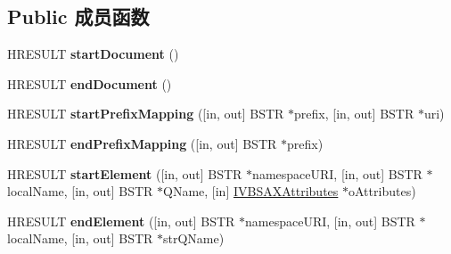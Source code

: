 \subsection*{Public 成员函数}
\begin{DoxyCompactItemize}
\item 
\mbox{\label{interface_m_s_x_m_l2_1_1_i_v_b_s_a_x_content_handler_a67db42d558655301b6a03a09e46c5174}} 
H\+R\+E\+S\+U\+LT {\bfseries start\+Document} ()
\item 
\mbox{\label{interface_m_s_x_m_l2_1_1_i_v_b_s_a_x_content_handler_a6842da9db003a4dc4baf76ac9760e700}} 
H\+R\+E\+S\+U\+LT {\bfseries end\+Document} ()
\item 
\mbox{\label{interface_m_s_x_m_l2_1_1_i_v_b_s_a_x_content_handler_affe4ce1e3b99e524f610cae1aa302a47}} 
H\+R\+E\+S\+U\+LT {\bfseries start\+Prefix\+Mapping} (\mbox{[}in, out\mbox{]} B\+S\+TR $\ast$prefix, \mbox{[}in, out\mbox{]} B\+S\+TR $\ast$uri)
\item 
\mbox{\label{interface_m_s_x_m_l2_1_1_i_v_b_s_a_x_content_handler_a53ae8b71dd21d0173cf4a5bf17ef6f2b}} 
H\+R\+E\+S\+U\+LT {\bfseries end\+Prefix\+Mapping} (\mbox{[}in, out\mbox{]} B\+S\+TR $\ast$prefix)
\item 
\mbox{\label{interface_m_s_x_m_l2_1_1_i_v_b_s_a_x_content_handler_a3db75f80da1c1de65facd33e078955ed}} 
H\+R\+E\+S\+U\+LT {\bfseries start\+Element} (\mbox{[}in, out\mbox{]} B\+S\+TR $\ast$namespace\+U\+RI, \mbox{[}in, out\mbox{]} B\+S\+TR $\ast$local\+Name, \mbox{[}in, out\mbox{]} B\+S\+TR $\ast$Q\+Name, \mbox{[}in\mbox{]} \hyperlink{interface_m_s_x_m_l2_1_1_i_v_b_s_a_x_attributes}{I\+V\+B\+S\+A\+X\+Attributes} $\ast$o\+Attributes)
\item 
\mbox{\label{interface_m_s_x_m_l2_1_1_i_v_b_s_a_x_content_handler_ad037e4ae64fa050242b3178395bc050d}} 
H\+R\+E\+S\+U\+LT {\bfseries end\+Element} (\mbox{[}in, out\mbox{]} B\+S\+TR $\ast$namespace\+U\+RI, \mbox{[}in, out\mbox{]} B\+S\+TR $\ast$local\+Name, \mbox{[}in, out\mbox{]} B\+S\+TR $\ast$str\+Q\+Name)

\end{DoxyCompactItemize}
